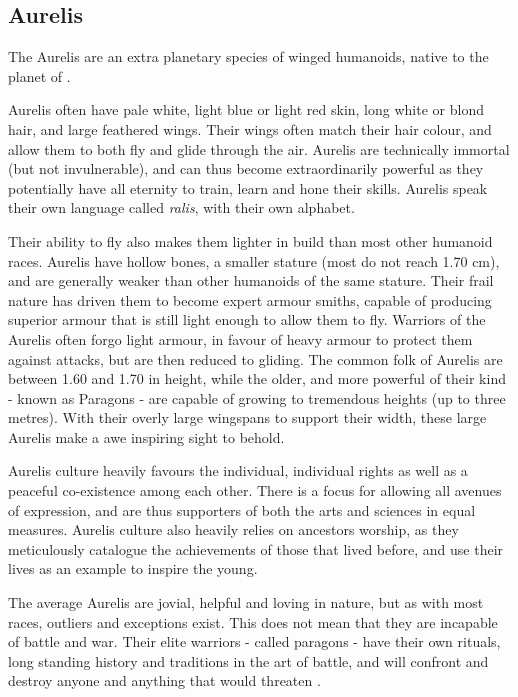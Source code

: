 \subsection{Aurelis}
\label{sec:Aurelis}

The Aurelis are an extra planetary species of winged humanoids, native to the
planet of .

Aurelis often have pale white, light blue or light red skin, long white or blond
hair, and large feathered wings. Their wings often match their hair colour,
and allow them to both fly and glide through the air. Aurelis are technically
immortal (but not invulnerable), and can thus become extraordinarily powerful
as they potentially have all eternity to train, learn and hone their
skills. Aurelis speak their own language called \emph{ralis}, with their own
alphabet.

Their ability to fly also makes them lighter in build than most other humanoid
races. Aurelis have hollow bones, a smaller stature (most do not reach 1.70
cm), and are generally weaker than other humanoids of the same stature. Their
frail nature has driven them to become expert armour smiths, capable of
producing superior armour that is still light enough to allow them to
fly. Warriors of the Aurelis often forgo light armour, in favour of heavy
armour to protect them against attacks, but are then reduced to gliding.
The common folk of Aurelis are between 1.60 and 1.70 in height, while the
older, and more powerful of their kind - known as Paragons - are capable of
growing to tremendous heights (up to three metres). With their overly large
wingspans to support their width, these large Aurelis make a awe inspiring
sight to behold.

Aurelis culture heavily favours the individual, individual rights as well as
a peaceful co-existence among each other. There is a focus for allowing all
avenues of expression, and are thus supporters of both the arts and sciences
in equal measures. Aurelis culture also heavily relies on ancestors worship,
as they meticulously catalogue the achievements of those that lived before,
and use their lives as an example to inspire the young.

The average Aurelis are jovial, helpful and loving in nature, but as with most
races, outliers and exceptions exist. This does not mean that they are
incapable of battle and war. Their elite warriors - called paragons - have
their own rituals, long standing history and traditions in the art of battle,
and will confront and destroy anyone and anything that would threaten
.

